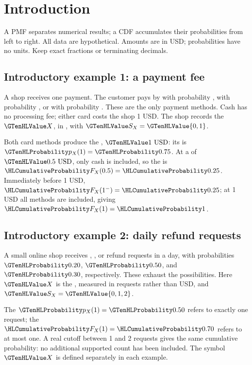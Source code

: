 \section{Introduction}\label{sec:intro}
A PMF separates numerical results; a CDF accumulates their probabilities from left to right. All data are hypothetical. Amounts are in USD; probabilities have no units. Keep exact fractions or terminating decimals.
\subsection{Introductory example 1: a payment fee}\label{prob:payment-intro}
A shop receives one payment. The customer pays by  with probability ,  with probability , or  with probability . These are the only payment methods. Cash has no processing fee; either card costs the shop 1 USD. The shop records the  $\cTwoValue{X}$, in , with  $\cTwoValue{S_X}=\cTwoValue{\{0,1\}}$.

Both card methods produce the , $\cTwoValue{1\text{ USD}}$: its  is $\cTwoMassHL{p_X(1)}=\cTwoMassHL{0.75}$. At a  of $\cTwoValue{0.5\text{ USD}}$, only cash is included, so the  is $\cTwoCDFHL{F_X(0.5)}=\cTwoCDFHL{0.25}$. Immediately before 1 USD, $\cTwoCDFHL{F_X(1^-)}=\cTwoCDFHL{0.25}$; at 1 USD all methods are included, giving $\cTwoCDFHL{F_X(1)}=\cTwoCDFHL{1}$.

\subsection{Introductory example 2: daily refund requests}\label{ex:refund-intro}
A small online shop receives , , or  refund requests in a day, with probabilities $\cTwoMassHL{0.20}$, $\cTwoMassHL{0.50}$, and $\cTwoMassHL{0.30}$, respectively. These exhaust the possibilities. Here $\cTwoValue{X}$ is the , measured in requests rather than USD, and $\cTwoValue{S_X}=\cTwoValue{\{0,1,2\}}$.

The  $\cTwoMassHL{p_X(1)}=\cTwoMassHL{0.50}$ refers to exactly one request; the  $\cTwoCDFHL{F_X(1)}=\cTwoCDFHL{0.70}$ refers to at most one. A real cutoff between 1 and 2 requests gives the same cumulative probability: no additional supported count has been included. The symbol $\cTwoValue{X}$ is defined separately in each example.

